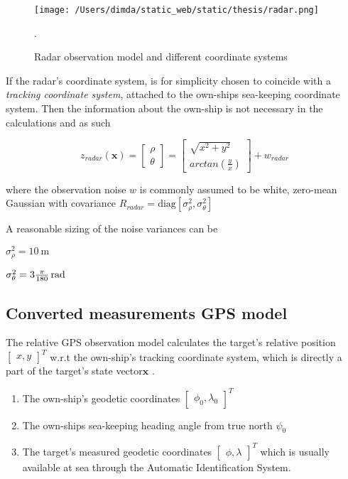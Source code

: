 \begin{figure}[H]
	\centering
	\texttt{[image: /Users/dimda/static\_web/static/thesis/radar.png]}
	\caption{Radar observation model and different coordinate systems}.
	\label{fig:radar_observation_model}
\end{figure}


If the radar's coordinate system, is for simplicity  chosen to coincide with a \emph{tracking coordinate system},  attached to the own-ships sea-keeping coordinate system. Then the information about the own-ship is not necessary in the calculations and as such

\begin{equation}
z_{radar}(\mathbf{x}) = \begin{bmatrix}
\rho \\
\theta
\end{bmatrix} = \begin{bmatrix}
\sqrt{x^2 + y^2} \\
arctan(\frac{y}{x})
\end{bmatrix} + w_{radar}
\end{equation}


where the observation noise $w$ is commonly assumed to be white, zero-mean Gaussian with covariance $R_{radar} = \text{diag}\left[\sigma^2_{\rho}, \sigma^2_{\theta}\right] $



A reasonable sizing of the noise variances can be
\begin{description}
	\item $\sigma^2_\rho = \SI{10}{\meter}$
	\item $\sigma^2_\theta = \SI[parse-numbers=false]{3\frac{\pi}{180}}{\radian}  $
\end{description}

\subsection{Converted measurements GPS model}


The relative GPS observation model calculates the target's relative position $\begin{bmatrix}x, y\end{bmatrix}^{T} $ w.r.t the own-ship's tracking coordinate system, which is directly a part of the target's state vector$\mathbf{x}$
. 

\begin{enumerate}
\item The own-ship's geodetic coordinates $\begin{bmatrix}\phi_{0}, \lambda_{0} \end{bmatrix}^{T}$
\item The own-ships sea-keeping heading angle from true north $\psi_{\textit{0}}$
\item The target's measured geodetic coordinates $\begin{bmatrix}\phi, \lambda\end{bmatrix}^{T}$ which is usually available at sea through the Automatic Identification System.
\end{enumerate}





